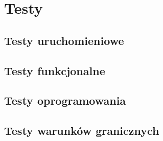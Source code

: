 \newpage
\section{Testy}

\subsection{Testy uruchomieniowe}
\subsection{Testy funkcjonalne}
\subsection{Testy oprogramowania}
\subsection{Testy warunków granicznych}
